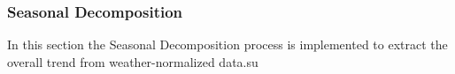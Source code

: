 \subsubsection{Seasonal Decomposition}
\label{sec:seasonaldecomposition}

In this section the Seasonal Decomposition process is implemented to extract the overall trend from weather-normalized data.su